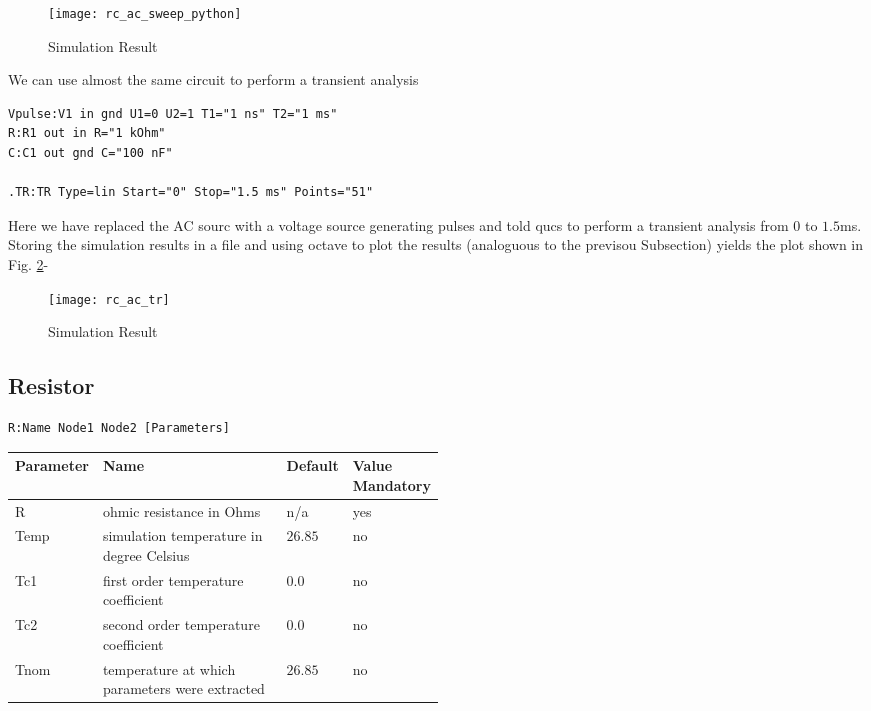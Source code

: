 \begin{figure}[h]
\begin{center}
  \texttt{[image: rc\_ac\_sweep\_python]}
  \caption{Simulation Result}
  \label{plot:rc_ac_python}
\end{center}
\end{figure}






We can use almost the same circuit to perform a transient analysis

\begin{verbatim}
Vpulse:V1 in gnd U1=0 U2=1 T1="1 ns" T2="1 ms"
R:R1 out in R="1 kOhm"
C:C1 out gnd C="100 nF"

.TR:TR Type=lin Start="0" Stop="1.5 ms" Points="51"
\end{verbatim}

Here we have replaced the AC sourc with a voltage source generating pulses and told qucs to perform a transient analysis from $0$ to $1.5$ms. Storing the simulation results in a file and using octave to plot the results (analoguous to the previsou Subsection) yields the plot shown in Fig. \ref{plot:rc_ac_tr}-

\begin{figure}[h]
\begin{center}
  \texttt{[image: rc\_ac\_tr]}
  \caption{Simulation Result}
  \label{plot:rc_ac_tr}
\end{center}
\end{figure}



\label{chap:devices}


\subsection{Resistor}

\begin{verbatim}
R:Name Node1 Node2 [Parameters]
\end{verbatim}


\begin{tabular}{|l|p{0.5\linewidth}|l|l|}
\hline
Parameter & Name & Default & Value Mandatory \\
\hline
R & ohmic resistance in Ohms & n/a & yes \\
Temp & simulation temperature in degree Celsius & $26.85$ & no \\
Tc1 & first order temperature coefficient & $0.0$ & no \\
Tc2 & second order temperature coefficient & $0.0$ & no \\
Tnom & temperature at which parameters were extracted & $26.85$ & no \\
\hline
\end{tabular}


